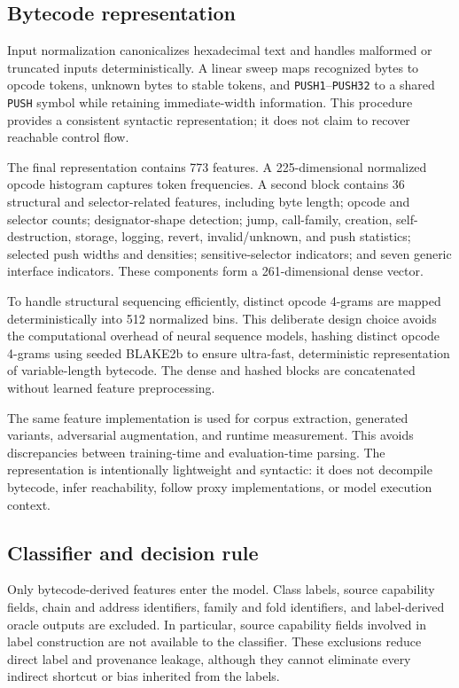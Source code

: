 \documentclass[conference]{IEEEtran}
\begin{document}
\subsection{Bytecode representation}

Input normalization canonicalizes hexadecimal text and handles malformed or truncated inputs deterministically. A linear sweep maps recognized bytes to opcode tokens, unknown bytes to stable tokens, and \texttt{PUSH1}--\texttt{PUSH32} to a shared \texttt{PUSH} symbol while retaining immediate-width information. This procedure provides a consistent syntactic representation; it does not claim to recover reachable control flow.

The final representation contains 773 features. A 225-dimensional normalized opcode histogram captures token frequencies. A second block contains 36 structural and selector-related features, including byte length; opcode and selector counts; designator-shape detection; jump, call-family, creation, self-destruction, storage, logging, revert, invalid/unknown, and push statistics; selected push widths and densities; sensitive-selector indicators; and seven generic interface indicators. These components form a 261-dimensional dense vector. 

To handle structural sequencing efficiently, distinct opcode 4-grams are mapped deterministically into 512 normalized bins. This deliberate design choice avoids the computational overhead of neural sequence models, hashing distinct opcode 4-grams using seeded BLAKE2b to ensure ultra-fast, deterministic representation of variable-length bytecode. The dense and hashed blocks are concatenated without learned feature preprocessing.

The same feature implementation is used for corpus extraction, generated variants, adversarial augmentation, and runtime measurement. This avoids discrepancies between training-time and evaluation-time parsing. The representation is intentionally lightweight and syntactic: it does not decompile bytecode, infer reachability, follow proxy implementations, or model execution context.

\subsection{Classifier and decision rule}

Only bytecode-derived features enter the model. Class labels, source capability fields, chain and address identifiers, family and fold identifiers, and label-derived oracle outputs are excluded. In particular, source capability fields involved in label construction are not available to the classifier. These exclusions reduce direct label and provenance leakage, although they cannot eliminate every indirect shortcut or bias inherited from the labels.
\end{document}

